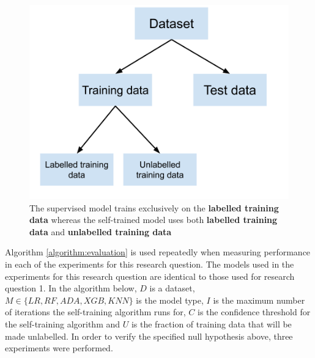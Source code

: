 \documentclass[../main.tex]{subfiles}
\begin{document}
\begin{figure}[H]
    \centering
    \includegraphics[scale=0.4]{images/Methodology/data_split.png}
    \caption{The supervised model trains exclusively on the \textbf{labelled training data} whereas the self-trained model uses both \textbf{labelled training data} and \textbf{unlabelled training data}}
    \label{fig:train_test_labelled_split}
\end{figure}


Algorithm \ref{algorithm:evaluation} is used repeatedly when measuring performance in each of the experiments for this research question. The models used in the experiments for this research question are identical to those used for research question 1. In the algorithm below, $D$ is a dataset, $M \in \{LR, RF, ADA, XGB, KNN\}$ is the model type, $I$ is the maximum number of iterations the self-training algorithm runs for, $C$ is the confidence threshold for the self-training algorithm and $U$ is the fraction of training data that will be made unlabelled. In order to verify the specified null hypothesis above, three experiments were performed. 
\end{document}
